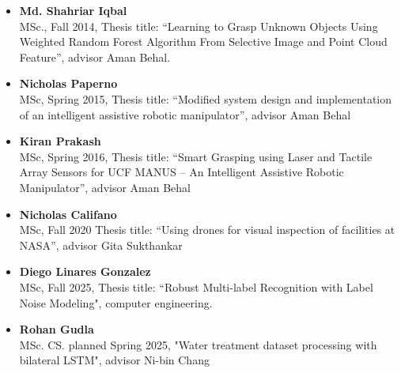 \begin{itemize}
        \item \textbf{Md. Shahriar Iqbal}\\
        MSc., Fall 2014, Thesis title: ``Learning to Grasp Unknown Objects Using Weighted Random Forest Algorithm From Selective Image and Point Cloud Feature'', advisor Aman Behal.
        
        \item \textbf{Nicholas Paperno} \\
        MSc, Spring 2015, Thesis title: ``Modified system design and implementation of an intelligent assistive robotic manipulator'', advisor Aman Behal
        
        \item \textbf{Kiran Prakash} \\
        MSc, Spring 2016, Thesis title: ``Smart Grasping using Laser and Tactile Array Sensors for UCF MANUS   – An Intelligent Assistive Robotic Manipulator'', advisor Aman Behal
        
        \item \textbf{Nicholas Califano} \\
        MSc, Fall 2020 Thesis title: ``Using drones for visual inspection of facilities at NASA'', advisor Gita Sukthankar
        
        \item \textbf{Diego Linares Gonzalez} \\
        MSc, Fall 2025, Thesis title: ``Robust Multi-label Recognition with Label Noise Modeling", computer engineering. 

        \item \textbf{Rohan Gudla}\\
        MSc. CS. planned Spring 2025, "Water treatment dataset processing with bilateral LSTM", advisor Ni-bin Chang

    \end{itemize}    